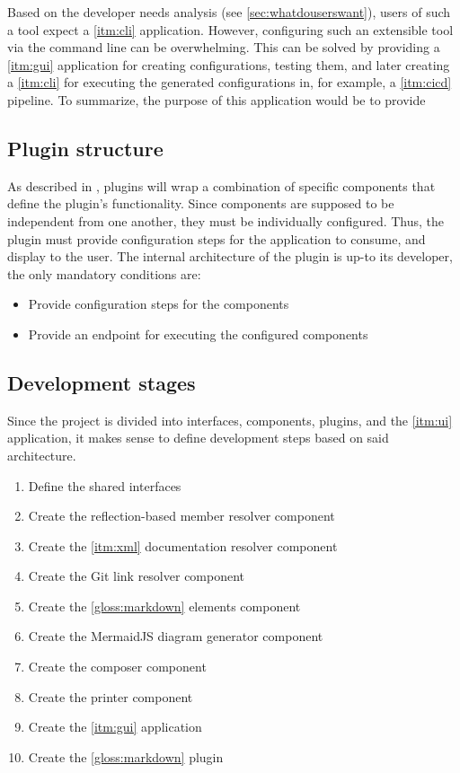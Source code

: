 Based on the developer needs analysis (see \ref{sec:whatdouserswant}), users of such a tool expect a \ref{itm:cli} application. However, configuring such an extensible tool via the command line can be overwhelming.
This can be solved by providing a \ref{itm:gui} application for creating configurations, testing them, and later creating a \ref{itm:cli} for executing the generated configurations in, for example, a \ref{itm:cicd} pipeline.
To summarize, the purpose of this application would be to provide

\subsection{Plugin structure}

As described in , plugins will wrap a combination of specific components that define the plugin's functionality.
Since components are supposed to be independent from one another, they must be individually configured.
Thus, the plugin must provide configuration steps for the application to consume, and display to the user.
The internal architecture of the plugin is up-to its developer, the only mandatory conditions are:
\begin{itemize}
    \item Provide configuration steps for the components
    \item Provide an endpoint for executing the configured components
\end{itemize}

\subsection{Development stages} \label{sec:developmentStages}

Since the project is divided into interfaces, components, plugins, and the \ref{itm:ui} application, it makes sense to define development steps based on said architecture.

\begin{enumerate}
    \item \label{num:stage1} Define the shared interfaces
    \item \label{num:stage2} Create the reflection-based member resolver component
    \item \label{num:stage3} Create the \ref{itm:xml} documentation resolver component
    \item \label{num:stage4} Create the Git link resolver component
    \item \label{num:stage5} Create the \ref{gloss:markdown} elements component
    \item \label{num:stage6} Create the MermaidJS diagram generator component
    \item \label{num:stage7} Create the composer component
    \item \label{num:stage8} Create the printer component
    \item \label{num:stage9} Create the \ref{itm:gui} application
    \item \label{num:stage10} Create the \ref{gloss:markdown} plugin
\end{enumerate}

